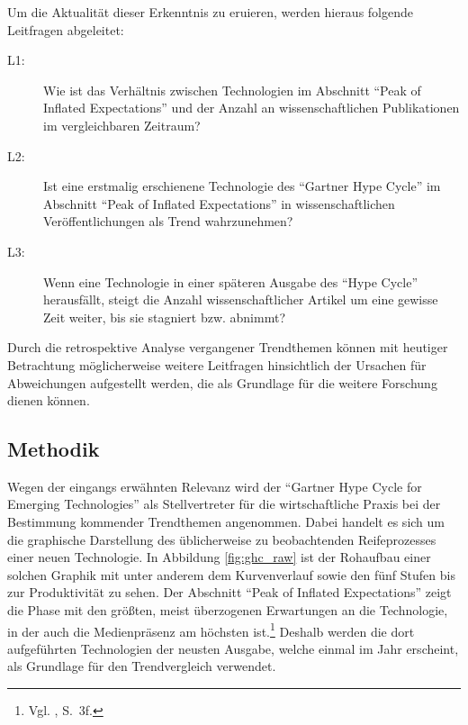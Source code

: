 Um die Aktualität dieser Erkenntnis zu eruieren, werden hieraus folgende Leitfragen abgeleitet:

\begin{description}
	\item[L1:] Wie ist das Verhältnis zwischen Technologien im Abschnitt "`Peak of Inflated Expectations"' und der Anzahl an wissenschaftlichen Publikationen im vergleichbaren Zeitraum?
\end{description}

\begin{description}
	\item[L2:] Ist eine erstmalig erschienene Technologie des "`Gartner Hype Cycle"' im Ab\-schnitt "`Peak of Inflated Expectations"' in wissen\-schaftlichen Ver\-öf\-fent\-lichungen als Trend wahrzunehmen?
\end{description}

\begin{description}
	\item[L3:] Wenn eine Technologie in einer späteren Ausgabe des "`Hype Cycle"' herausfällt, steigt die Anzahl wissenschaftlicher Artikel um eine gewisse Zeit weiter, bis sie stagniert bzw. abnimmt?
\end{description}

Durch die retrospektive Analyse vergangener Trendthemen können mit heutiger Betrachtung möglicherweise weitere Leitfragen hinsichtlich der Ursachen für Abweichungen aufgestellt werden, die als Grundlage für die weitere Forschung dienen können.

\subsection{Methodik}
Wegen der eingangs erwähnten Relevanz wird der "`Gartner Hype Cycle for Emerging Technologies"' als Stellvertreter für die wirtschaftliche Praxis bei der Bestimmung kommender Trendthemen angenommen. Dabei handelt es sich um die graphische Darstellung des üblicherweise zu beobachtenden Reifeprozesses einer neuen Technologie. In Abbildung \ref{fig:ghc_raw} ist der Rohaufbau einer solchen Graphik mit unter anderem dem Kurvenverlauf sowie den fünf Stufen bis zur Produktivität zu sehen. Der Abschnitt "`Peak of Inflated Expectations"' zeigt die Phase mit den größten, meist überzogenen Erwartungen an die Technologie, in der auch die Medienpräsenz am höchsten ist.\footnote{Vgl. , S.~3f.} Deshalb werden die dort aufgeführten Technologien der neusten Ausgabe, welche einmal im Jahr erscheint, als Grundlage für den Trendvergleich verwendet.

